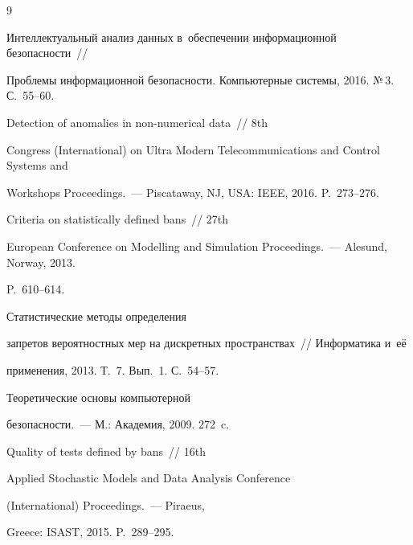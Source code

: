 {\small\frenchspacing


{%




\begin{thebibliography}{9}





\vspace*{-2pt}









Интеллектуальный анализ данных в~обеспечении информационной безопасности~/\!\!/ 


Проблемы информационной безопасности. Компьютерные системы, 2016. №\,3. С.~55--60.




 Detection of anomalies in non-numerical data~/\!\!/ 8th 


Congress (International) on Ultra Modern Telecommunications and Control Systems and 


Workshops Proceedings.~---  Piscataway, NJ, USA: IEEE, 2016. P.~273--276.




      Criteria on statistically defined bans~/\!\!/ 27th 


European Conference on Modelling and Simulation Proceedings.~--- Alesund, Norway, 2013. 


P.~610--614.




      Статистические методы определения 


запретов вероятностных мер на дискретных пространствах~/\!\!/ Информатика и~её 


применения, 2013. Т.~7. Вып.~1. С.~54--57.




      Теоретические основы компьютерной 


безопасности.~--- М.: Академия, 2009. 272~c.




      Quality of tests defined by bans~/\!\!/ 16th 


Applied Stochastic Models and Data Analysis Conference


(International) Proceedings.~--- Piraeus, 


Greece: ISAST, 2015. P.~289--295. 


        \end{thebibliography}


} }








